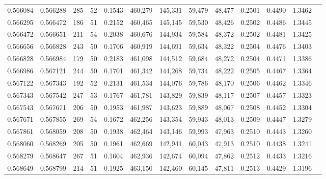 \begin{tabular}{rrrrrrrrrrrrr}
0.566084 & 0.566288 &   285 &  52 &                                     0.1543 & 460,279 & 145,331 &  59,479 &  48,477 & 0.2501 & 0.4490 & 1.3462 \\
0.566295 & 0.566472 &   186 &  51 &                                     0.2152 & 460,465 & 145,145 &  59,530 &  48,426 & 0.2502 & 0.4486 & 1.3445 \\
0.566472 & 0.566651 &   211 &  54 &                                     0.2038 & 460,676 & 144,934 &  59,584 &  48,372 & 0.2502 & 0.4481 & 1.3425 \\
0.566656 & 0.566828 &   243 &  50 &                                     0.1706 & 460,919 & 144,691 &  59,634 &  48,322 & 0.2504 & 0.4476 & 1.3403 \\
0.566828 & 0.566984 &   179 &  50 &                                     0.2183 & 461,098 & 144,512 &  59,684 &  48,272 & 0.2504 & 0.4471 & 1.3386 \\
0.566986 & 0.567121 &   244 &  50 &                                     0.1701 & 461,342 & 144,268 &  59,734 &  48,222 & 0.2505 & 0.4467 & 1.3364 \\
0.567122 & 0.567343 &   192 &  52 &                                     0.2131 & 461,534 & 144,076 &  59,786 &  48,170 & 0.2506 & 0.4462 & 1.3346 \\
0.567343 & 0.567542 &   247 &  53 &                                     0.1767 & 461,781 & 143,829 &  59,839 &  48,117 & 0.2507 & 0.4457 & 1.3323 \\
0.567543 & 0.567671 &   206 &  50 &                                     0.1953 & 461,987 & 143,623 &  59,889 &  48,067 & 0.2508 & 0.4452 & 1.3304 \\
0.567671 & 0.567855 &   269 &  54 &                                     0.1672 & 462,256 & 143,354 &  59,943 &  48,013 & 0.2509 & 0.4447 & 1.3279 \\
0.567861 & 0.568059 &   208 &  50 &                                     0.1938 & 462,464 & 143,146 &  59,993 &  47,963 & 0.2510 & 0.4443 & 1.3260 \\
0.568060 & 0.568269 &   205 &  50 &                                     0.1961 & 462,669 & 142,941 &  60,043 &  47,913 & 0.2510 & 0.4438 & 1.3241 \\
0.568279 & 0.568647 &   267 &  51 &                                     0.1604 & 462,936 & 142,674 &  60,094 &  47,862 & 0.2512 & 0.4433 & 1.3216 \\
0.568649 & 0.568799 &   214 &  51 &                                     0.1925 & 463,150 & 142,460 &  60,145 &  47,811 & 0.2513 & 0.4429 & 1.3196 \\

\end{tabular}
